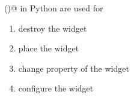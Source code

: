 \question
\lstinline@nfig()@ in Python \lstinline@Tkinter@ are used for

\begin{enumerate}
\item destroy the widget
\item place the widget
\item change property of the widget
\item configure the widget
\end{enumerate}

